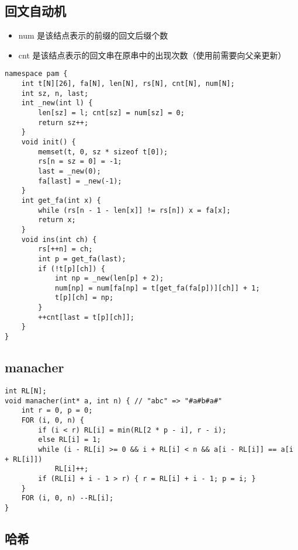 \documentclass[]{article}
\providecommand{\tightlist}{%
  \setlength{\itemsep}{0pt}\setlength{\parskip}{0pt}}
\begin{document}
\hypertarget{ux56deux6587ux81eaux52a8ux673a}{%
\subsection{回文自动机}\label{ux56deux6587ux81eaux52a8ux673a}}

\begin{itemize}
\tightlist
\item
  num 是该结点表示的前缀的回文后缀个数
\item
  cnt 是该结点表示的回文串在原串中的出现次数（使用前需要向父亲更新）
\end{itemize}

\begin{verbatim}
namespace pam {
    int t[N][26], fa[N], len[N], rs[N], cnt[N], num[N];
    int sz, n, last;
    int _new(int l) {
        len[sz] = l; cnt[sz] = num[sz] = 0;
        return sz++;
    }
    void init() {
        memset(t, 0, sz * sizeof t[0]);
        rs[n = sz = 0] = -1;
        last = _new(0);
        fa[last] = _new(-1);
    }
    int get_fa(int x) {
        while (rs[n - 1 - len[x]] != rs[n]) x = fa[x];
        return x;
    }
    void ins(int ch) {
        rs[++n] = ch;
        int p = get_fa(last);
        if (!t[p][ch]) {
            int np = _new(len[p] + 2);
            num[np] = num[fa[np] = t[get_fa(fa[p])][ch]] + 1;
            t[p][ch] = np;
        }
        ++cnt[last = t[p][ch]];
    }
}
\end{verbatim}

\hypertarget{manacher}{%
\subsection{manacher}\label{manacher}}

\begin{verbatim}
int RL[N];
void manacher(int* a, int n) { // "abc" => "#a#b#a#"
    int r = 0, p = 0;
    FOR (i, 0, n) {
        if (i < r) RL[i] = min(RL[2 * p - i], r - i);
        else RL[i] = 1;
        while (i - RL[i] >= 0 && i + RL[i] < n && a[i - RL[i]] == a[i + RL[i]])
            RL[i]++;
        if (RL[i] + i - 1 > r) { r = RL[i] + i - 1; p = i; }
    }
    FOR (i, 0, n) --RL[i];
}

\end{verbatim}

\hypertarget{ux54c8ux5e0c}{%
\subsection{哈希}\label{ux54c8ux5e0c}}
\end{document}
